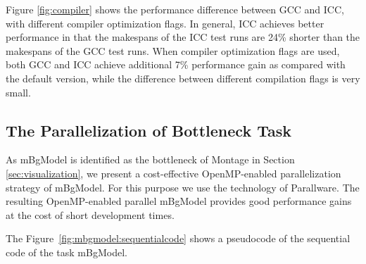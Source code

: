 Figure \ref{fig:compiler} shows the performance difference between GCC and ICC, with different compiler optimization flags. In general, ICC achieves better performance in that the makespans of the ICC test runs are 24\% shorter than the makespans of the GCC test runs. When compiler optimization flags are used, both GCC and ICC achieve additional 7\% performance gain as compared with the default version, while the difference between different compilation flags is very small.

\subsection{The Parallelization of Bottleneck Task}
\label{v1_sec:parallware}

As mBgModel is identified as the bottleneck of Montage in Section \ref{sec:visualization}, we present a cost-effective OpenMP-enabled parallelization strategy of mBgModel. For this purpose we use the technology of Parallware. The resulting OpenMP-enabled parallel mBgModel provides good performance gains at the cost of short development times. 

The Figure~\ref{fig:mbgmodel:sequentialcode} shows a pseudocode of the sequential code of the task mBgModel. 


